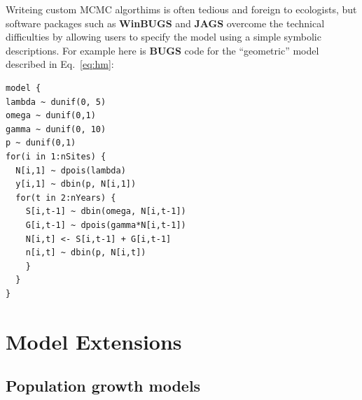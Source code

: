 \documentclass[12pt]{article}
\begin{document}
Writeing custom MCMC algorthims is often tedious and foreign to
ecologists, but software packages such as \textbf{WinBUGS} and
\textbf{JAGS} overcome the technical difficulties by allowing
users to specify the model using a simple symbolic descriptions. For
example here is \textbf{BUGS} code for the ``geometric'' model described
in Eq.~\ref{eq:hm}:
\begin{verbatim}
model {
lambda ~ dunif(0, 5)
omega ~ dunif(0,1)
gamma ~ dunif(0, 10)
p ~ dunif(0,1)
for(i in 1:nSites) {
  N[i,1] ~ dpois(lambda)
  y[i,1] ~ dbin(p, N[i,1])
  for(t in 2:nYears) {
    S[i,t-1] ~ dbin(omega, N[i,t-1])
    G[i,t-1] ~ dpois(gamma*N[i,t-1])
    N[i,t] <- S[i,t-1] + G[i,t-1]
    n[i,t] ~ dbin(p, N[i,t])
    }
  }
}
\end{verbatim}



\section{Model Extensions}
\label{sec:ext}

\subsection{Population growth models}

\end{document}
